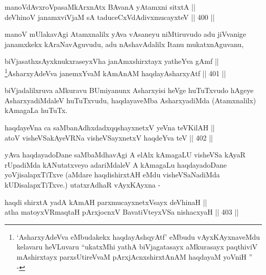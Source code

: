 \begin{shl}
manoVdAvxroVpasaMkArxnAtx BAvanA yA\s \s tamxni sitxtA || \\
deVhinoV janamxviVjaM sA taduceCxVdAdivxmucayxteV \hfill || 400 ||  
\end{shl}

\begin{artha}
manoV mUlakavAgi Atamxnalilx yAva vAsaneyu niMtiruvudo adu jiVvanige
janamxkekx kAraNavAguvudu, adu nAshavAdalilx Itanu mukatxnAguvanu,
\end{artha}


\begin{shl}
biVjasathxsAyxknukxraseyxVha janAmx\s \s shirxtayx yatheYva gAmf || \\
\footnote{`AsharxyAdeVva eMbudakekx haqdayAshqyAtf' eMbudu
vAyxKAyxnaveMdu kelavaru heVLuvaru ``ukatxMhi yathA biVjagatasayx aMkurasayx paqthiviV mAshirxtayx parxsUtireVvaM pArxjAcnxshirxtAnAM haqdayaM yoVniH '' -}AsharxyAdeVva janemxYvaM kAmAnAM haqdayAsharxyAtf \hfill || 401 ||  
\end{shl}


\begin{artha}
biVjadalilxruva aMkuravu BUmiyanunx Asharxyisi heVge
huTuTxvudo hAgeye AsharxyadiMdaleV huTuTxvudu, haqdayaveMba
AsharxyadiMda (Atamxnalilx) kAmagaLa huTuTx.
\end{artha}


\begin{shl}
haqdayeVna ca saMbanAdhxdadxqqshayxnetxV yeVna teV\s KilAH || \\
atoV visheVSakAyeVRNa visheVSayxnetxV haqdeYva teV \hfill || 402 ||  
\end{shl}

\begin{artha}
yAva haqdayadoDane saMbaMdhavAgi A elAlx kAmagaLU visheVSa kAyaR
rUpadiMda kANutatxveyo adariMdaleV A kAmagaLu haqdayadoDane
yoVjisalapxTiTxve (aMdare haqdishirxtAH eMdu visheVSaNadiMda kUDisalapxTiTxve.) utatxrAdhaR vAyxKAyxna -
\end{artha}

\begin{shl}
haqdi shirxtA yadA kAmAH parxmucayxnetxV\s sayx deVhinaH || \\
atha matoyxVR\s maqtaH pArxjocnxV BavatiVteyxVSa nishacxyaH \hfill || 403 ||  
\end{shl}

